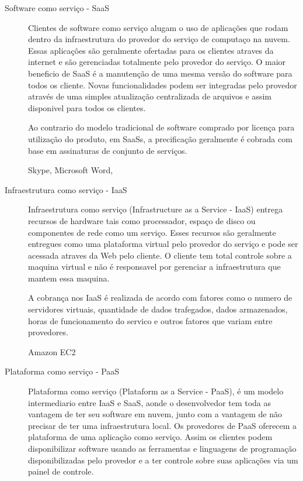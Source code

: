 		\begin{description}
		\item [Software como serviço - SaaS]
		Clientes de software como serviço alugam o uso de aplicações que rodam dentro da infraestrutura do provedor do serviço de computaço na nuvem. Essas aplicações são geralmente ofertadas para os clientes atraves da internet e são gerenciadas totalmente pelo provedor do serviço. O maior beneficio de SaaS é a manutenção de uma mesma versão do software para todos os cliente. Novas funcionalidades podem ser integradas pelo provedor através de uma simples atualização centralizada de arquivos e assim disponivel para todos os clientes.

		Ao contrario do modelo tradicional de software comprado por licença para utilização do produto, em SaaSs, a precificação geralmente é cobrada com base em assinaturas de conjunto de serviços.


		Skype, Microsoft Word, 

		\item [Infraestrutura como serviço - IaaS]
		Infraestrutura como serviço (Infrastructure as a Service - IaaS) entrega recursos de hardware tais como processador, espaço de disco ou componentes de rede como um serviço. Esses recursos são geralmente entregues como uma plataforma virtual pelo provedor do serviço e pode ser acessada atraves da Web pelo cliente. O cliente tem total controle sobre a maquina virtual e não é responsavel por gerenciar a infraestrutura que mantem essa maquina.
	
		A cobrança nos IaaS é realizada de acordo com fatores como o numero de servidores virtuais, quantidade de dados trafegados, dados armazenados, horas de funcionamento do servico e outros fatores que variam entre provedores.

		Amazon EC2
	

		\item[Plataforma como serviço - PaaS]
		Plataforma como serviço (Plataform as a Service - PaaS), é um modelo intermediario entre IaaS e SaaS, aonde o desenvolvedor tem toda as vantagem de ter seu software em nuvem, junto com a vantagem de não precisar de ter uma infraestrutura local. Os provedores de PaaS oferecem a plataforma de uma aplicação como serviço. Assim os clientes podem disponibilizar software usando as ferramentas e linguagens de programação disponibilizadas pelo provedor e a ter controle sobre suas aplicações via um painel de controle.


\end{description}
